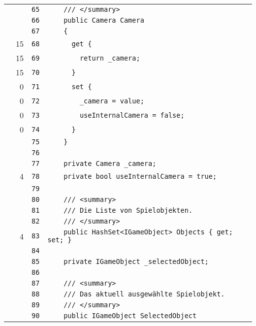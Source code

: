 \documentclass[a4paper,10pt]{article}
\begin{document}
\begin{longtable}[l]{lrrl}
\cellcolor{gray} &  & \verb~65~ & \verb~    /// </summary>~\\
\cellcolor{gray} &  & \verb~66~ & \verb~    public Camera Camera~\\
\cellcolor{gray} &  & \verb~67~ & \verb~    {~\\
\cellcolor{green} & 15 & \verb~68~ & \verb~      get {~\\
\cellcolor{green} & 15 & \verb~69~ & \verb~        return _camera;~\\
\cellcolor{green} & 15 & \verb~70~ & \verb~      }~\\
\cellcolor{red} & 0 & \verb~71~ & \verb~      set {~\\
\cellcolor{red} & 0 & \verb~72~ & \verb~        _camera = value;~\\
\cellcolor{red} & 0 & \verb~73~ & \verb~        useInternalCamera = false;~\\
\cellcolor{red} & 0 & \verb~74~ & \verb~      }~\\
\cellcolor{gray} &  & \verb~75~ & \verb~    }~\\
\cellcolor{gray} &  & \verb~76~ & \verb~~\\
\cellcolor{gray} &  & \verb~77~ & \verb~    private Camera _camera;~\\
\cellcolor{green} & 4 & \verb~78~ & \verb~    private bool useInternalCamera = true;~\\
\cellcolor{gray} &  & \verb~79~ & \verb~~\\
\cellcolor{gray} &  & \verb~80~ & \verb~    /// <summary>~\\
\cellcolor{gray} &  & \verb~81~ & \verb~    /// Die Liste von Spielobjekten.~\\
\cellcolor{gray} &  & \verb~82~ & \verb~    /// </summary>~\\
\cellcolor{green} & 4 & \verb~83~ & \verb~    public HashSet<IGameObject> Objects { get; set; }~\\
\cellcolor{gray} &  & \verb~84~ & \verb~~\\
\cellcolor{gray} &  & \verb~85~ & \verb~    private IGameObject _selectedObject;~\\
\cellcolor{gray} &  & \verb~86~ & \verb~~\\
\cellcolor{gray} &  & \verb~87~ & \verb~    /// <summary>~\\
\cellcolor{gray} &  & \verb~88~ & \verb~    /// Das aktuell ausgewählte Spielobjekt.~\\
\cellcolor{gray} &  & \verb~89~ & \verb~    /// </summary>~\\
\cellcolor{gray} &  & \verb~90~ & \verb~    public IGameObject SelectedObject~\\

\end{longtable}
\end{document}
